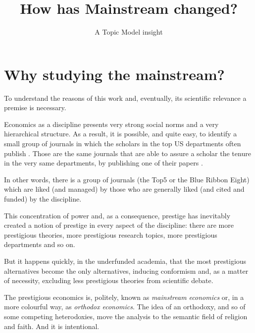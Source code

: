 \documentclass[a4paper, 11pt, headings=standardclasses, tablecaptionsbelow]{scrartcl}
\title{How has Mainstream changed?}
\subtitle{A Topic Model insight}
\author{}
\date{}
\begin{document}
\maketitle


\section{Why studying the mainstream?}
To understand the reasons of this work and, eventually, its scientific relevance a premise is necessary.

Economics as a discipline presents very strong social norms and a very hierarchical structure.
As a result, it is possible, and quite easy, to identify a small group of journals in which the scholars in the top US departments often publish \parencite{card2013,kim2006,kim2009,dusansky1998,hamermesh2013,ellison2003,heck2006}.
Those are the same journals that are able to assure a scholar the tenure in the very same departments, by publishing one of their papers \parencite{heckman2020}.

In other words, there is a group of journals (the Top5 or the Blue Ribbon Eight) which are liked (and managed) by those who are generally liked (and cited and funded) by the discipline.

This concentration of power and, as a consequence, prestige has inevitably created a notion of prestige in every aspect of the discipline: there are more prestigious theories, more prestigious research topics, more prestigious departments and so on.

But it happens quickly, in the underfunded academia, that the most prestigious alternatives become the only alternatives, inducing conformism and, as a matter of necessity, excluding less prestigious theories from scientific debate.

The prestigious economics is, politely, known as \textit{mainstream economics} or, in a more colourful way, as \textit{orthodox economics}. The idea of an orthodoxy, and so of some competing heterodoxies, move the analysis to the semantic field of religion and faith. And it is intentional.
\end{document}
